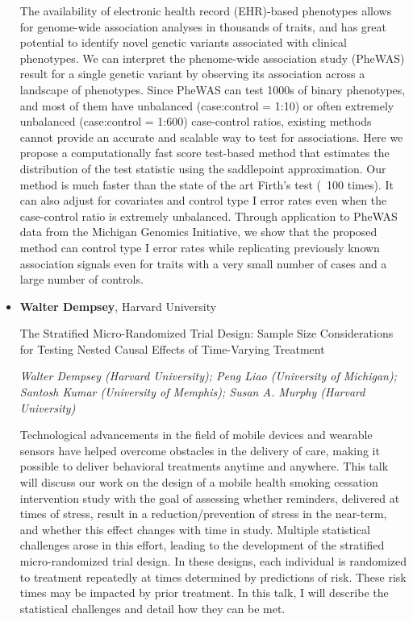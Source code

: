 \begin{itemize}
The availability of electronic health record (EHR)-based phenotypes allows for genome-wide association analyses in thousands of traits, and has great potential to identify novel genetic variants associated with clinical phenotypes. We can interpret the phenome-wide association study (PheWAS) result for a single genetic variant by observing its association across a landscape of phenotypes. Since PheWAS can test 1000s of binary phenotypes, and most of them have unbalanced (case:control = 1:10) or often extremely unbalanced (case:control = 1:600) case-control ratios, existing methods cannot provide an accurate and scalable way to test for associations. Here we propose a computationally fast score test-based method that estimates the distribution of the test statistic using the saddlepoint approximation. Our method is much faster than the state of the art Firth’s test (~100 times). It can also adjust for covariates and control type I error rates even when the case-control ratio is extremely unbalanced. Through application to PheWAS data from the Michigan Genomics Initiative, we show that the proposed method can control type I error rates while replicating previously known association signals even for traits with a very small number of cases and a large number of controls.

\item \textbf{Walter Dempsey}, Harvard University

The Stratified Micro-Randomized Trial Design:  Sample Size Considerations for Testing Nested Causal Effects of Time-Varying Treatment

\emph{\footnotesize Walter Dempsey (Harvard University); Peng Liao (University of Michigan); Santosh Kumar (University of Memphis); Susan A. Murphy (Harvard University)}

Technological advancements in the field of mobile devices and wearable sensors have helped overcome obstacles in the delivery of care, making it possible to deliver behavioral treatments anytime and anywhere. This talk will discuss our work on the design of a mobile health smoking cessation intervention study with the goal of  assessing whether reminders, delivered at  times of stress, result in a reduction/prevention of stress in the near-term, and whether this effect changes with time in study.  Multiple statistical challenges arose in this effort, leading to the development of the stratified micro-randomized trial design.  In these designs, each individual is randomized to treatment repeatedly at times determined by predictions of risk.  These risk times may be impacted by prior treatment. In this talk, I will describe the statistical challenges and detail how they can be met.

\end{itemize}

